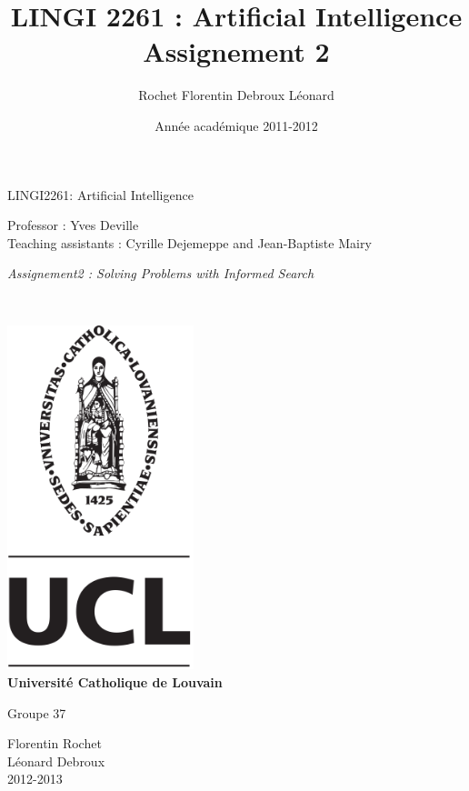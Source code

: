 \documentclass[a4paper,10pt]{article}
\title{LINGI 2261 : Artificial Intelligence \\
Assignement 2}
\author{Rochet Florentin Debroux Léonard}
\date{Année académique 2011-2012}
\begin{document}
	\begin{titlepage}
		\begin{center}
			{\huge LINGI2261: Artificial Intelligence}\\
			\vspace{0.4cm}
			
			{\Large {Professor : Yves Deville\\ \vspace{0.2cm} Teaching assistants : Cyrille Dejemeppe and Jean-Baptiste Mairy  }}\\
			\vspace{0.6cm}
			
			{\Large \textit{ Assignement2 : Solving Problems with Informed Search}}\\
			\vspace{1.2cm}

			\texttt{}\\
			\vspace{0.2cm}

			\includegraphics[height=10cm]{pageGarde.png}\\
			\vspace{0.1cm}
			{\Large \textbf{Universit\'e Catholique de Louvain}}
			\vspace{0.7cm}

			Groupe 37 \\
			\vspace{0.2cm}
			
			Florentin Rochet \\
			Léonard Debroux\\
			\vspace{0.2cm}
			2012-2013\\
		\end{center}
	\end{titlepage}
\end{document}
